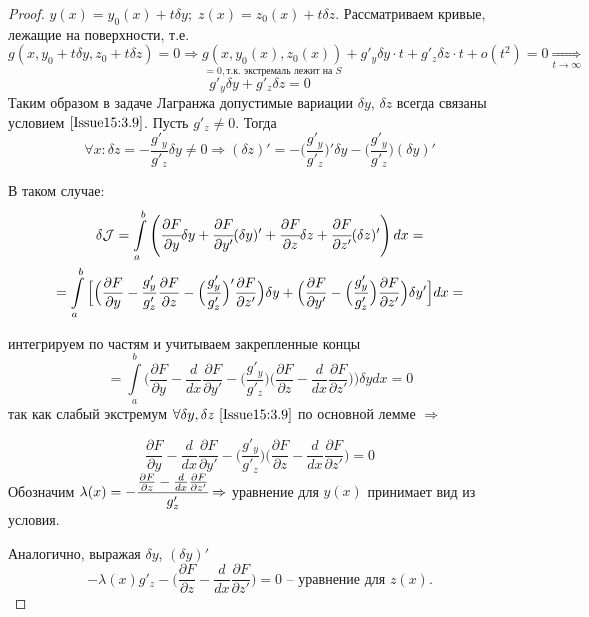 \begin{proof}
$y(x)=y_0(x)+t\delta y;\;z(x)=z_0(x)+t \delta z.$ Рассматриваем кривые, лежащие на поверхности, т.е. $g(x,y_0+t\delta y,z_0+t \delta z)=0\Rightarrow \underset{=0, \text{т.к. экстремаль лежит на } S}{g(x,y_0(x), z_0(x))}+g'_y\delta y \cdot t + g'_z\delta z \cdot t +o(t^2)=0 \underset{t \rightarrow \infty}{\Rightarrow} $
\begin{equation}
    \label{Issue15:3.9}
    g'_y\delta y + g'_z\delta z = 0
\end{equation}
Таким образом в задаче Лагранжа допустимые вариации $\delta y$, $\delta z$ всегда связаны условием $\eqref{Issue15:3.9}$. Пусть $g'_z\neq 0$. Тогда $$\forall x: \delta z = -\frac{g'_y}{g'_z}\delta y\neq 0\Rightarrow (\delta z)'= -\Big(\frac{g'_y}{g'_z}\Big)'\delta y - \Big(\frac{g'_y}{g'_z}\Big)(\delta y)'$$

В таком случае:
\begin{multline*}
    \delta \mathcal{J}=\int\limits_a^b \left( \cfrac{\partial F}{\partial y}\delta y + \cfrac{\partial F}{\partial y'}(\delta y)' + \cfrac{\partial F}{\partial z}\delta z + \cfrac{\partial F}{\partial z'}(\delta z)' \right)d x = \\ 
    = \int\limits_a^b \Big[\Big(\frac{\partial F}{\partial y}-\frac{g'_y}{g'_z}\frac{\partial F}{\partial z}-\Big(\frac{g'_y}{g'_z}\Big)'\frac{\partial F}{\partial z'}\Big)\delta y + \Big(\frac{\partial F}{\partial y'}- \Big(\frac{g'_y}{g'_z}\Big)\frac{\partial F}{\partial z'}\Big)\delta y'\Big]d x = 
\end{multline*}

интегрируем по частям и учитываем закрепленные концы
\[ 
    =\int\limits_a^b\Big(\frac{\partial F}{\partial y}-\frac{d}{d x}\frac{\partial F}{\partial y'}-\Big(\frac{g'_y}{g'_z}\Big)\Big(\frac{\partial F}{\partial z}-\frac{d}{d x}\frac{\partial F}{\partial z'}\Big) \Big)\delta y d x = 0 
\]
так как слабый экстремум $\forall \delta y, \delta z ~\eqref{Issue15:3.9}$ по основной лемме $\Rightarrow$

$$ \frac{\partial F}{\partial y} - \frac{d}{d x}\frac{\partial F}{\partial y'} - \Big(\frac{g'_y}{g'_z}\Big)\Big(\frac{\partial F}{\partial z}-\frac{d}{d x}\frac{\partial F}{\partial z'}\Big)=0$$
Обозначим $\lambda (x) = -\cfrac{\frac{\partial F}{\partial z}-\frac{d}{d x}\frac{\partial F}{\partial z'}}{g'_z}\Rightarrow$ уравнение для $y(x)$ принимает вид из условия.

Аналогично, выражая $\delta y$, $(\delta y)'$ 
$$-\lambda (x) g'_z-\Big(\frac{\partial F}{\partial z}- \frac{d}{d x}\frac{\partial F}{\partial z'}\Big)=0  \text{ -- уравнение для $z(x)$.}$$
\end{proof}
